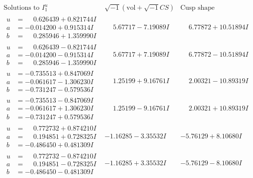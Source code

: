\documentclass[1p]{elsarticle_modified}
\theoremstyle{definition}
\newcommand{\I}{\sqrt{-1}}
\begin{document}
$$\begin{array}{c|c|c}  
\text{Solutions to }I^u_{1}& \I (\text{vol} + \sqrt{-1}CS) & \text{Cusp shape}\\
 \hline 
\begin{aligned}
u &= \phantom{-}0.626439 + 0.821744 I \\
a &= -0.014200 + 0.915314 I \\
b &= \phantom{-}0.285946 + 1.359990 I\end{aligned}
 & \phantom{-}5.67717 - 7.19089 I & \phantom{-}6.77872 + 10.51894 I \\ \hline\begin{aligned}
u &= \phantom{-}0.626439 - 0.821744 I \\
a &= -0.014200 - 0.915314 I \\
b &= \phantom{-}0.285946 - 1.359990 I\end{aligned}
 & \phantom{-}5.67717 + 7.19089 I & \phantom{-}6.77872 - 10.51894 I \\ \hline\begin{aligned}
u &= -0.735513 + 0.847069 I \\
a &= -0.061617 - 1.306230 I \\
b &= -0.731247 - 0.579536 I\end{aligned}
 & \phantom{-}1.25199 + 9.16761 I & \phantom{-}2.00321 - 10.89319 I \\ \hline\begin{aligned}
u &= -0.735513 - 0.847069 I \\
a &= -0.061617 + 1.306230 I \\
b &= -0.731247 + 0.579536 I\end{aligned}
 & \phantom{-}1.25199 - 9.16761 I & \phantom{-}2.00321 + 10.89319 I \\ \hline\begin{aligned}
u &= \phantom{-}0.772732 + 0.874210 I \\
a &= \phantom{-}0.194851 + 0.728325 I \\
b &= -0.486450 + 0.481309 I\end{aligned}
 & -1.16285 - 3.35532 I & -5.76129 + 8.10680 I \\ \hline\begin{aligned}
u &= \phantom{-}0.772732 - 0.874210 I \\
a &= \phantom{-}0.194851 - 0.728325 I \\
b &= -0.486450 - 0.481309 I\end{aligned}
 & -1.16285 + 3.35532 I & -5.76129 - 8.10680 I \\ \hline\begin{aligned}

\end{aligned}
\end{array}$$
\end{document}
